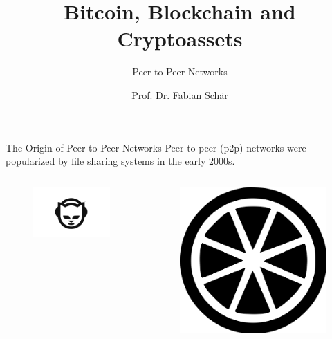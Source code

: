 \documentclass[handout]{beamer}
\title{Bitcoin, Blockchain and Cryptoassets}
\subtitle{Peer-to-Peer Networks}
\author{Prof. Dr. Fabian Schär}
\institute{University of Basel}
\begin{document}
\thispagestyle{empty}
\begin{frame}[noframenumbering]
	\titlepage
\end{frame}

\begin{frame}{The Origin of Peer-to-Peer Networks}
	Peer-to-peer (p2p) networks were popularized by file sharing systems in the early 2000s.
	\begin{columns}
		\begin{column}{0.5\textwidth}
			\begin{figure}
				\begin{center}
					\includegraphics[height = 0.25\textheight]{../assets/images/napster}
				\end{center}
			\end{figure}
		\end{column}
		\begin{column}{0.5\textwidth}
			\begin{figure}
				\begin{center}
					\includegraphics[height = 0.16\textheight]{../assets/images/limewire}

\end{center}
\end{figure}
\end{column}
\end{columns}
\end{frame}
\end{document}
